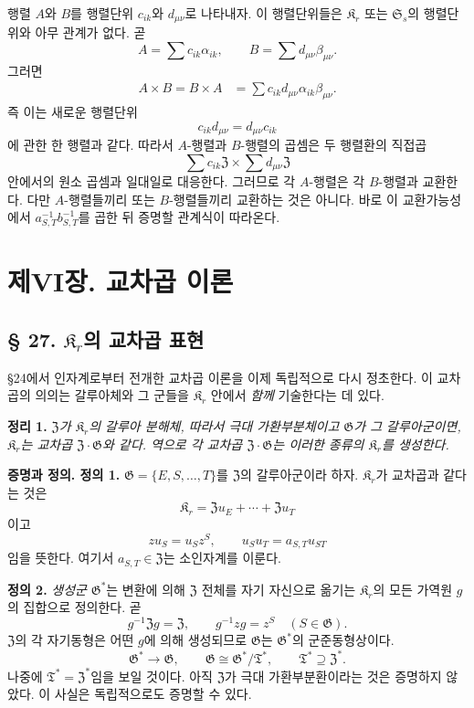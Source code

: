 행렬 \(A\)와 \(B\)를 행렬단위 \(c_{ik}\)와 \(d_{\mu\nu}\)로 나타내자. 이 행렬단위들은 \(\mathfrak K_r\) 또는 \(\mathfrak S_s\)의 행렬단위와 아무 관계가 없다. 곧
\[
        A=\sum c_{ik}\alpha_{ik},
        \qquad
        B=\sum d_{\mu\nu}\beta_{\mu\nu}.
\]
그러면
\[
\begin{aligned}
A\times B=B\times A
 &=\sum c_{ik}d_{\mu\nu}
       \alpha_{ik}\beta_{\mu\nu}.
\end{aligned}
\]
즉 이는 새로운 행렬단위
\[
        c_{ik}d_{\mu\nu}=d_{\mu\nu}c_{ik}
\]
에 관한 한 행렬과 같다. 따라서 \(A\)-행렬과 \(B\)-행렬의 곱셈은 두 행렬환의 직접곱
\[
        \sum c_{ik}\mathfrak Z
        \times
        \sum d_{\mu\nu}\mathfrak Z
\]
안에서의 원소 곱셈과 일대일로 대응한다. 그러므로 각 \(A\)-행렬은 각 \(B\)-행렬과 교환한다. 다만 \(A\)-행렬들끼리 또는 \(B\)-행렬들끼리 교환하는 것은 아니다. 바로 이 교환가능성에서 \(a_{S,T}^{-1}b_{S,T}^{-1}\)를 곱한 뒤 증명할 관계식이 따라온다.

\section*{제VI장. 교차곱 이론}

\subsection*{§ 27. \(\mathfrak K_r\)의 교차곱 표현}

§24에서 인자계로부터 전개한 교차곱 이론을 이제 독립적으로 다시 정초한다. 이 교차곱의 의의는 갈루아체와 그 군들을 \(\mathfrak K_r\) 안에서 \emph{함께} 기술한다는 데 있다.

\noindent\textbf{정리 1.} \emph{\(\mathfrak Z\)가 \(\mathfrak K_r\)의 갈루아 분해체, 따라서 극대 가환부분체이고 \(\mathfrak G\)가 그 갈루아군이면, \(\mathfrak K_r\)는 교차곱 \(\mathfrak Z\mathbin{\cdot}\mathfrak G\)와 같다. 역으로 각 교차곱 \(\mathfrak Z\mathbin{\cdot}\mathfrak G\)는 이러한 종류의 \(\mathfrak K_r\)를 생성한다.}

\noindent\textbf{증명과 정의. 정의 1.} \(\mathfrak G=\{E,S,\ldots,T\}\)를 \(\mathfrak Z\)의 갈루아군이라 하자. \(\mathfrak K_r\)가 교차곱과 같다는 것은
\[
        \mathfrak K_r
        =\mathfrak Zu_E+\cdots+\mathfrak Zu_T
\]
이고
\[
        zu_S=u_Sz^S,
        \qquad
        u_Su_T=a_{S,T}u_{ST}
\]
임을 뜻한다. 여기서 \(a_{S,T}\in\mathfrak Z\)는 소인자계를 이룬다.

\noindent\textbf{정의 2.} \emph{생성군} \(\mathfrak G^*\)는 변환에 의해 \(\mathfrak Z\) 전체를 자기 자신으로 옮기는 \(\mathfrak K_r\)의 모든 가역원 \(g\)의 집합으로 정의한다. 곧
\[
        g^{-1}\mathfrak Zg=\mathfrak Z,
        \qquad
        g^{-1}zg=z^S
        \quad(S\in\mathfrak G).
\]
\(\mathfrak Z\)의 각 자기동형은 어떤 \(g\)에 의해 생성되므로 \(\mathfrak G\)는 \(\mathfrak G^*\)의 군준동형상이다.
\[
        \mathfrak G^*\longrightarrow\mathfrak G,
        \qquad
        \mathfrak G\cong\mathfrak G^*/\mathfrak T^*,
        \qquad
        \mathfrak T^*\supseteq\mathfrak Z^*.
\]
나중에 \(\mathfrak T^*=\mathfrak Z^*\)임을 보일 것이다. 아직 \(\mathfrak Z\)가 극대 가환부분환이라는 것은 증명하지 않았다. 이 사실은 독립적으로도 증명할 수 있다.

